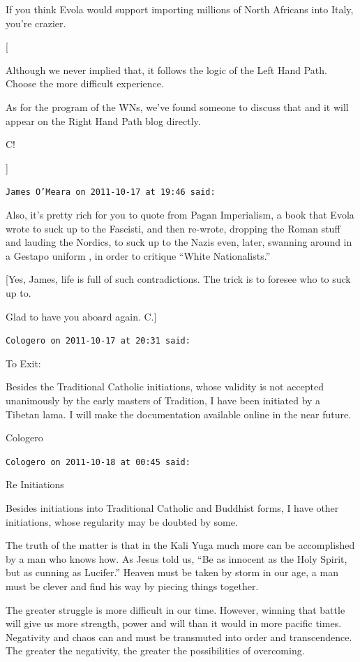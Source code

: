 \begin{footnotesize}
\begin{sffamily}
If you think Evola would support importing millions of North Africans into Italy, you're crazier. 

[

Although we never implied that, it follows the logic of the Left Hand Path. Choose the more difficult experience.

As for the program of the WNs, we've found someone to discuss that and it will appear on the Right Hand Path blog directly.

C!

]

\hfill

\texttt{James O'Meara on 2011-10-17 at 19:46 said:}

Also, it's pretty rich for you to quote from Pagan Imperialism, a book that Evola wrote to suck up to the Fascisti, and then re-wrote, dropping the Roman stuff and lauding the Nordics, to suck up to the Nazis even, later, swanning around in a Gestapo uniform , in order to critique ``White Nationalists.'' 

[Yes, James, life is full of such contradictions. The trick is to foresee who to suck up to.

Glad to have you aboard again. C.]

\hfill

\texttt{Cologero on 2011-10-17 at 20:31 said:}

To Exit:

Besides the Traditional Catholic initiations, whose validity is not accepted unanimously by the early masters of Tradition, I have been initiated by a Tibetan lama. I will make the documentation available online in the near future.

Cologero


\hfill

\texttt{Cologero on 2011-10-18 at 00:45 said:}

Re Initiations

Besides initiations into Traditional Catholic and Buddhist forms, I have other initiations, whose regularity may be doubted by some.

The truth of the matter is that in the Kali Yuga much more can be accomplished by a man who knows how. As Jesus told us, ``Be as innocent as the Holy Spirit, but as cunning as Lucifer.'' Heaven must be taken by storm in our age, a man must be clever and find his way by piecing things together.

The greater struggle is more difficult in our time. However, winning that battle will give us more strength, power and will than it would in more pacific times. Negativity and chaos can and must be transmuted into order and transcendence. The greater the negativity, the greater the possibilities of overcoming.


\end{sffamily}
\end{footnotesize}
